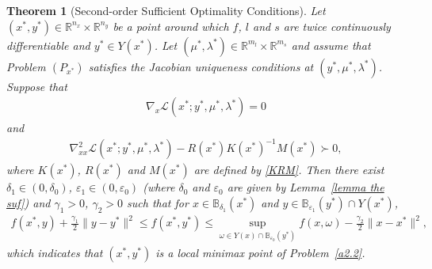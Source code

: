 \documentclass{article}
\newtheorem{theorem}{Theorem}
\begin{document}
	\begin{theorem}[Second-order Sufficient Optimality Conditions]\label{Second-order theorem}
		Let $(x^{\ast}, y^{\ast}) \in \mathbb{R}^{n_{x}} \times \mathbb{R}^{n_{y}}$ be a point around which $f$, $l$ and $s$ are twice continuously differentiable and $y^{\ast} \in Y(x^{\ast})$. Let $(\mu^{\ast}, \lambda^{\ast}) \in \mathbb{R}^{m_{l}} \times \mathbb{R}^{m_{s}}$ and assume that Problem $(P_{x^{\ast}})$ satisfies the Jacobian uniqueness conditions at $(y^{\ast}, \mu^{\ast}, \lambda^{\ast})$. Suppose that
		\begin{align*}
			\nabla_{x}\mathcal{L}(x^{\ast}; y^{\ast}, \mu^{\ast}, \lambda^{\ast}) = 0
		\end{align*}
		and
		\begin{align*}
			\nabla_{xx}^{2}\mathcal{L}(x^{\ast}; y^{\ast}, \mu^{\ast}, \lambda^{\ast}) - R(x^{\ast})K(x^{\ast})^{-1}M(x^{\ast}) \succ 0,
		\end{align*}
		where $K(x^{\ast})$, $R(x^{\ast})$ and $M(x^{\ast})$ are defined by \eqref{KRM}. Then there exist $\delta_{1} \in (0, \delta_{0})$, $\varepsilon_{1}\in(0, \varepsilon_{0})$ (where $\delta_{0}$ and $\varepsilon_{0}$ are given by Lemma~\ref{lemma the suf}) and $\gamma_{1} > 0$, $\gamma_{2} > 0$ such that for $x\in\mathbb{B}_{\delta_{1}}(x^{\ast})$ and $y \in \mathbb{B}_{\varepsilon_{1}}(y^{\ast})\cap Y(x^{\ast})$,
		\begin{align}
			f(x^{\ast}, y) + \frac{\gamma_{1}}{2}\|y - y^{\ast}\|^{2} \leq f(x^{\ast}, y^{\ast}) \leq \sup_{\omega \in Y(x)\cap\mathbb{B}_{\varepsilon_{0}}(y^{\ast})} f(x, \omega) - \frac{\gamma_{2}}{2}\|x - x^{\ast}\|^{2},
		\end{align}
		which indicates that $(x^{\ast}, y^{\ast})$ is a local minimax point of Problem~\eqref{a2.2}.
	\end{theorem}
	
\end{document}
